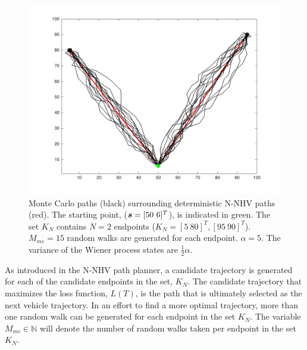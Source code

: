 \begin{figure}[hbt!]
	\centering
	\includegraphics[width=0.8\linewidth]{figures/brownian_motion_mc.png}
	\ssp
	\caption{ Monte Carlo paths (black) surrounding deterministic N-NHV paths (red). The starting point, (${\it{\boldsymbol{s}}} = [50 \ 6]^T$), is indicated in green. The set $K_N$ contains $N=2$ endpoints ($K_N = [ 5 \ 80 ]^T, [ 95 \ 90]^T$). $M_{mc}=15$ random walks are generated for each endpoint. $\alpha=5$. The variance of the Wiener process states are $\frac{1}{2} \alpha$.}
\end{figure}

As introduced in the N-NHV path planner, a candidate trajectory is generated for each of the candidate endpoints in the set, $K_N$. The candidate trajectory that maximizes the loss function, $L(T)$, is the path that is ultimately selected as the next vehicle trajectory. In an effort to find a more optimal trajectory, more than one random walk can be generated for each endpoint in the set $K_N$. The variable $M_{mc} \in \mathbb{N}$ will denote the number of random walks taken per endpoint in the set $K_N$.



